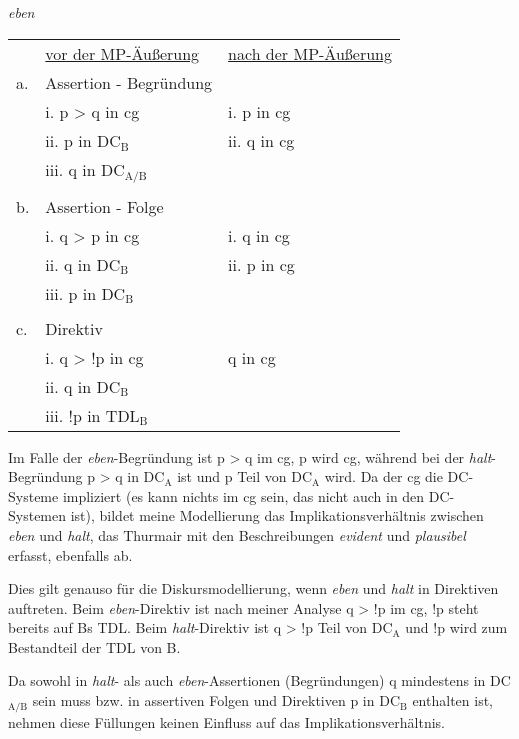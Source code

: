 \begin{exe}
        \ex\label{656} \textit{eben}\\
    \begin{tabular}[t]{lll}
    & \ul{vor der MP-Äußerung} & \ul{nach der MP-Äußerung}\\
    a. & Assertion - Begründung & {}\\
    {} & i. p > q in cg & i. p in cg\\
	{} & ii. p in DC$_{\textrm{B}}$ & ii. q in cg\\
	{} & iii. q in DC$_{\textrm{A/B}}$ & {}\\	
	{} & {} & {}\\
	b. & Assertion - Folge & {}\\
	{} & i. q > p in cg & i. q in cg\\
	{} & ii. q in DC$_{\textrm{B}}$ & ii. p in cg\\
	{} & iii. p in DC$_{\textrm{B}}$ & {}\\
	{} & {} & {}\\
	c. & Direktiv & {}\\
	{} & i. q > !p in cg & q in cg\\
	{} & ii. q in DC$_{\textrm{B}}$ & {}\\
	{} & iii. !p in TDL$_{\textrm{B}}$\\
    \end{tabular}
\end{exe}
Im Falle der \textit{eben}-Begründung ist p > q im cg, p wird cg, während bei der \textit{halt}-Begründung p > q in DC$_{\textrm{A}}$ ist und p Teil von DC$_{\textrm{A}}$ wird. Da der cg die DC-Systeme impliziert (es kann nichts im cg sein, das nicht auch in den DC-Systemen ist), bildet meine Modellierung das Implikationsverhältnis zwischen \textit{eben} und \textit{halt}, das Thurmair mit den Beschreibungen \textit{evident} und \textit{plausibel} erfasst, ebenfalls ab. 

Dies gilt genauso für die Diskursmodellierung, wenn \textit{eben} und \textit{halt} in Direktiven auftreten. Beim \textit{eben}-Direktiv ist nach meiner Analyse q > !p im cg, !p steht bereits auf Bs TDL. Beim \textit{halt}-Direktiv ist q > !p Teil von DC$_{\textrm{A}}$ und !p wird zum Bestandteil der TDL von B. 

Da sowohl in \textit{halt}- als auch \textit{eben}-Assertionen (Begründungen) q mindestens in DC$_{\textrm{A/B}}$ sein muss bzw. in assertiven Folgen und Direktiven p in DC$_{\textrm{B}}$ enthalten ist, nehmen diese Füllungen keinen Einfluss auf das Implikationsverhältnis. 

